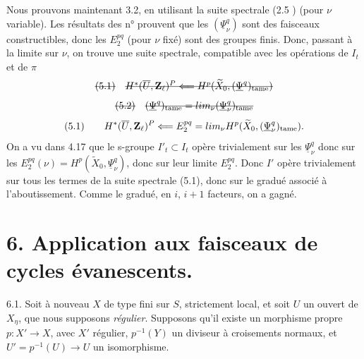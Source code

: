 \documentclass[11pt,a4paper]{article}
\begin{document}
Nous prouvons maintenant 3.2, en utilisant la suite spectrale (2.5 ) (pour $\nu$ variable). Les résultats des n° \struck{\ill{}}  prouvent que les $(\underline{\Psi}^q_\nu)$ sont des faisceaux constructibles, donc les $E_2^{pq}$ \struck{\ill{}} (pour $\nu$ fixé) sont des groupes finis. Donc, passant à la limite sur $\nu$, on trouve une suite spectrale, compatible avec les opérations de $I_t$ et de $\pi$ \ill{} \ill{}
\[
\text{\struck{(5.1)}} \quad \text{\struck{$H^*(\overline{U}, \mathbf{Z}_\ell)^P \Longleftarrow H^p(\widetilde{X}_0, (\underline{\Psi}^q)_{\mathrm{tame}})$}}
\]
\[
\text{\struck{(5.2)}} \quad \text{\struck{$(\underline{\Psi}^q)_{\mathrm{tame}} = \varprojlim_\nu (\underline{\Psi}^q_\nu)_{\mathrm{tame}}$}}
\]
\[
\text{(5.1)} \qquad H^*(\overline{U}, \mathbf{Z}_\ell)^P \Longleftarrow E_2^{pq} = \varprojlim_\nu H^p(\widetilde{X}_0, (\underline{\Psi}^q_\nu)_{\mathrm{tame}}) .
\]
On a vu dans 4.17 que le s-groupe $I'_t \subset I_t$ opère trivialement sur les $\underline{\Psi}^q_\nu$ donc \struck{\ill{}} sur les $E_2^{pq}(\nu) = H^p(\widetilde{X}_0, \underline{\Psi}^q_\nu)$, donc sur leur limite $E_2^{pq}$. Donc $I'$ opère trivialement sur tous les \struck{\ill{}} termes de la suite spectrale (5.1), donc sur le \struck{\ill{}} gradué associé à l'aboutissement. Comme le  gradué, en  $i$,  $i+1$ facteurs, on a gagné.


\section*{6. Application aux faisceaux de cycles évanescents.}

6.1. Soit à nouveau $X$ de type fini sur $S$,  strictement local, et soit $U$ un ouvert de $X_\eta$, que nous supposons \emph{régulier}.  Supposons qu'il existe un morphisme propre $p : X' \to X$,  avec $X'$ régulier, $p^{-1}(Y)$ un diviseur à croisements normaux, et $U' = p^{-1}(U) \to U$ un isomorphisme.

\end{document}
